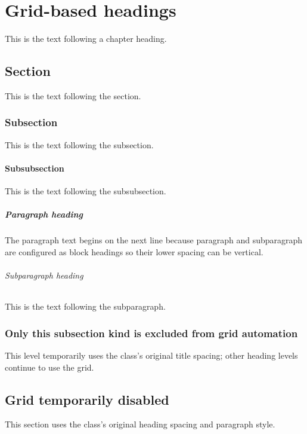 \documentclass{report}
\begin{document}
\chapter{Grid-based headings}
This is the text following a chapter heading.

\section{Section}
This is the text following the section.

\subsection{Subsection}
This is the text following the subsection.

\subsubsection{Subsubsection}
This is the text following the subsubsection.

\paragraph{Paragraph heading}
The paragraph text begins on the next line because paragraph and subparagraph
are configured as block headings so their lower spacing can be vertical.

\subparagraph{Subparagraph heading}
This is the text following the subparagraph.

{\GridAutoOff[subsection]
\subsection{Only this subsection kind is excluded from grid automation}
This level temporarily uses the class's original title spacing; other heading
levels continue to use the grid.
}

\begin{gridautoff}
\section{Grid temporarily disabled}
This section uses the class's original heading spacing and paragraph style.
\end{gridautoff}
\end{document}
